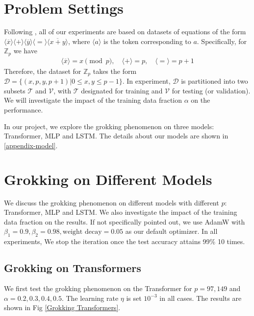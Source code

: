 \documentclass{article}
\begin{document}
\section{Problem Settings}
\label{Settings}

Following \cite{power2022grokking}, all of our experiments are based on datasets of equations of the form $\langle \overline{x}\rangle\langle +\rangle\langle \overline{y}\rangle\langle =\rangle\langle \overline{x+y}\rangle$, where $\langle a\rangle$ is the token corresponding to $a$. Specifically, for $\mathbb{Z}_p$ we have
\begin{align}
    \langle \overline{x}\rangle = x\pmod{p},\quad \langle +\rangle = p,\quad \langle =\rangle = p+1
    \label{token}
\end{align}
Therefore, the dataset for $\mathbb{Z}_p$ takes the form $\mathcal{D} = \lbrace \left( x, p, y, p+1\right)\left.\right| 0 \leqslant x, y\leqslant p-1\rbrace$. In experiment, $\mathcal{D}$ is partitioned into two subsets $\mathcal{T}$ and $\mathcal{V}$, with $\mathcal{T}$ designated for training and $\mathcal{V}$ for testing (or validation). We will investigate the impact of the training data fraction $\alpha$ on the performance.

In our project, we explore the grokking phenomenon on three models: Transformer, MLP and LSTM. The details about our models are shown in \ref{appendix-model}.

\section{Grokking on Different Models}
\label{models}

We discuss the grokking phenomenon on different models with different $p$: Transformer, MLP and LSTM. We also investigate the impact of the training data fraction on the results. If not specifically pointed out, we use AdamW with $\beta_1 = 0.9, \beta_2 = 0.98, \text{weight decay} = 0.05$ as our default optimizer. In all experiments, We stop the iteration once the test accuracy attains 99\% 10 times.

\subsection{Grokking on Transformers}
\label{Transformers}
We first test the grokking phenomenon on the Transformer for $p = 97, 149$ and $\alpha = 0.2, 0.3, 0.4, 0.5$. The learning rate $\eta$ is set $10^{-3}$ in all cases. The results are shown in Fig \ref{Grokking Transformers}. %
\end{document}
